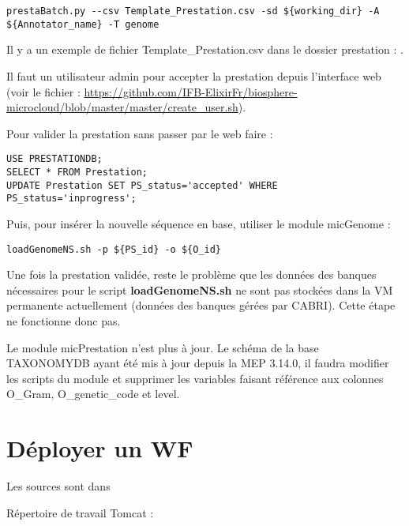 \begin{lstlisting}[style=bash]
prestaBatch.py --csv Template_Prestation.csv -sd ${working_dir} -A ${Annotator_name} -T genome
\end{lstlisting}

Il y a un exemple de fichier Template\_Prestation.csv dans le dossier prestation : .
\newline
\begin{mycolorbox}
	Il faut un utilisateur admin pour accepter la prestation depuis l'interface web (voir le fichier : \url{https://github.com/IFB-ElixirFr/biosphere-microcloud/blob/master/master/create_user.sh}).
\end{mycolorbox}
\bigskip

Pour valider la prestation sans passer par le web faire :
\begin{lstlisting}[style=SQL]
USE PRESTATIONDB;
SELECT * FROM Prestation;
UPDATE Prestation SET PS_status='accepted' WHERE PS_status='inprogress';
\end{lstlisting}
\bigskip
Puis, pour insérer la nouvelle séquence en base, utiliser le module micGenome :
\begin{lstlisting}[style=bash]
loadGenomeNS.sh -p ${PS_id} -o ${O_id}
\end{lstlisting}

\begin{mycolorbox}
	Une fois la prestation validée, reste le problème que les données des banques nécessaires pour le script \textbf{loadGenomeNS.sh} ne sont pas stockées dans la VM permanente actuellement (données des banques gérées par CABRI).
	Cette étape ne fonctionne donc pas.
\end{mycolorbox}

Le module micPrestation n'est plus à jour. Le schéma de la base TAXONOMYDB ayant été mis à jour depuis la MEP 3.14.0, il faudra modifier les scripts du module et supprimer les variables faisant référence aux colonnes O\_Gram, O\_genetic\_code et level.
\newline

\section{Déployer un WF}
Les sources sont dans 
\newline

Répertoire de travail Tomcat : 
\newline


